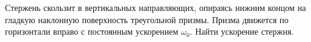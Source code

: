 Стержень скользит в вертикальных направляющих, опираясь
нижним концом на гладкую наклонную поверхность треугольной призмы.
Призма движется по горизонтали вправо с постоянным
ускорением $\omega_{0}$.
Найти ускорение стержня.
